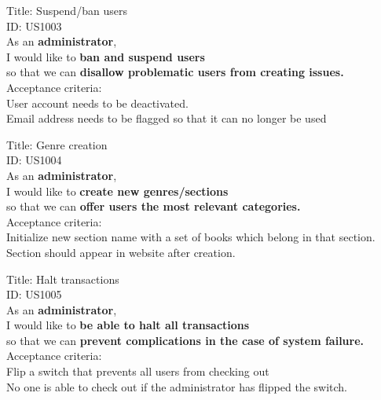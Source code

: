 \documentclass{article}
\begin{document}
\begin{framed}
\noindent
Title: Suspend/ban users \\
ID: US1003 \\
As an \textbf{administrator},\\
 \textbullet  \quad \quad I would like to \textbf{ban and suspend users}\\ 
 \textbullet  \quad \quad so that we can \textbf{disallow problematic users from creating issues.}\\
 Acceptance criteria: \\
  \textbullet  \quad \quad User account needs to be deactivated.\\
  \textbullet  \quad \quad Email address needs to be flagged so that it can no longer be used
\end{framed}


\begin{framed}
\noindent
Title: Genre creation \\
ID: US1004 \\
As an \textbf{administrator},\\
 \textbullet  \quad \quad I would like to \textbf{create new genres/sections}\\ 
 \textbullet  \quad \quad so that we can \textbf{offer users the most relevant categories.}\\
 Acceptance criteria: \\
  \textbullet  \quad \quad Initialize new section name with a set of books which belong in that section.\\
  \textbullet  \quad \quad Section should appear in website after creation. 
\end{framed}


\begin{framed}
\noindent
Title: Halt transactions \\
ID: US1005 \\
As an \textbf{administrator},\\
 \textbullet  \quad \quad I would like to \textbf{be able to halt all transactions}\\ 
 \textbullet  \quad \quad so that we can \textbf{prevent complications in the case of system failure.}\\
 Acceptance criteria: \\
  \textbullet  \quad \quad Flip a switch that prevents all users from checking out\\
  \textbullet  \quad \quad No one is able to check out if the administrator has flipped the switch.
\end{framed}
\end{document}
